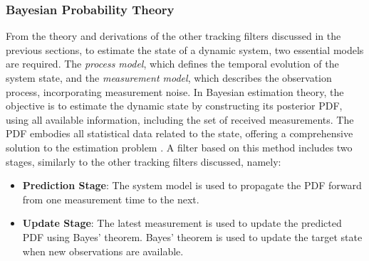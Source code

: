 \subsubsection{Bayesian Probability Theory}
From the theory and derivations of the other tracking filters discussed in the previous sections, to estimate the state of a dynamic system, two essential models are required. The \textit{process model}, which defines the temporal evolution of the system state, and the \textit{measurement model}, which describes the observation process, incorporating measurement noise.
 In Bayesian estimation theory, the objective is to estimate the dynamic state by constructing its posterior \ac{PDF}, using all available information, including the set of received measurements. The \ac{PDF} embodies all statistical data related to the state, offering a comprehensive solution to the estimation problem \cite{Arulampalam2007}. A filter based on this method includes two stages, similarly to the other tracking filters discussed, namely:
\begin{itemize}
    \item \textbf{Prediction Stage}: The system model is used to propagate the \ac{PDF} forward from one measurement time to the next.
    \item \textbf{Update Stage}: The latest measurement is used to update the predicted \ac{PDF} using Bayes' theorem. Bayes' theorem is used to update the target state when new observations are available.
\end{itemize}

